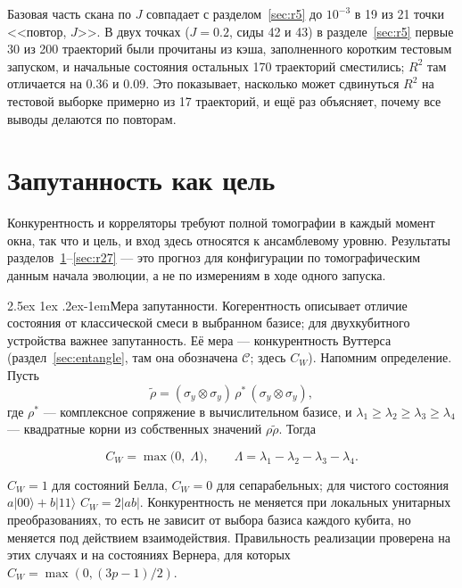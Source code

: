 \documentclass[12pt,a4paper]{report}
\makeatletter
\renewcommand\paragraph{\@startsection{paragraph}{4}{\z@}%
  {2.5ex \@plus1ex \@minus.2ex}{-1em}{\normalfont\normalsize\bfseries}}
\numberwithin{equation}{chapter}
\makeatother
\begin{document}
Базовая часть скана по $J$ совпадает с разделом~\ref{sec:r5} до $10^{-3}$ в
19 из 21 точки <<повтор, $J$>>. В двух точках ($J=0.2$, сиды 42 и 43) в
разделе~\ref{sec:r5} первые 30 из 200 траекторий были прочитаны из кэша,
заполненного коротким тестовым запуском, и начальные состояния остальных
170 траекторий сместились; $R^2$ там отличается на $0.36$ и $0.09$. Это
показывает, насколько может сдвинуться $R^2$ на тестовой выборке примерно
из 17 траекторий, и ещё раз объясняет, почему все выводы делаются по повторам.

\section{Запутанность как цель}
\label{sec:r24}

Конкурентность и корреляторы требуют полной томографии в каждый момент окна,
так что и цель, и вход здесь относятся к ансамблевому уровню. Результаты
разделов~\ref{sec:r24}--\ref{sec:r27} --- это прогноз для конфигурации по
томографическим данным начала эволюции, а не по измерениям в ходе одного
запуска.

\paragraph{Мера запутанности.} Когерентность описывает отличие состояния от
классической смеси в выбранном базисе; для двухкубитного устройства важнее
запутанность. Её мера --- конкурентность Вуттерса
(раздел~\ref{sec:entangle}, там она обозначена $\mathcal C$; здесь $C_W$).
Напомним определение. Пусть
\[
\tilde\rho=(\sigma_y\otimes\sigma_y)\,\rho^*\,(\sigma_y\otimes\sigma_y),
\]
где $\rho^*$ --- комплексное сопряжение в вычислительном базисе, и
$\lambda_1\ge\lambda_2\ge\lambda_3\ge\lambda_4$ --- квадратные корни из
собственных значений $\rho\tilde\rho$. Тогда
\begin{keybox}
\begin{equation}
C_W=\max\bigl(0,\;\Lambda\bigr),\qquad
\Lambda=\lambda_1-\lambda_2-\lambda_3-\lambda_4 .
\label{eq:wootters}
\end{equation}
\end{keybox}
$C_W=1$ для состояний Белла, $C_W=0$ для сепарабельных; для чистого
состояния $a|00\rangle+b|11\rangle$ $C_W=2|ab|$. Конкурентность не меняется
при локальных унитарных преобразованиях, то есть не зависит от выбора
базиса каждого кубита, но меняется под действием взаимодействия.
Правильность реализации проверена на этих случаях и на состояниях Вернера,
для которых $C_W=\max(0,(3p-1)/2)$.
\end{document}

